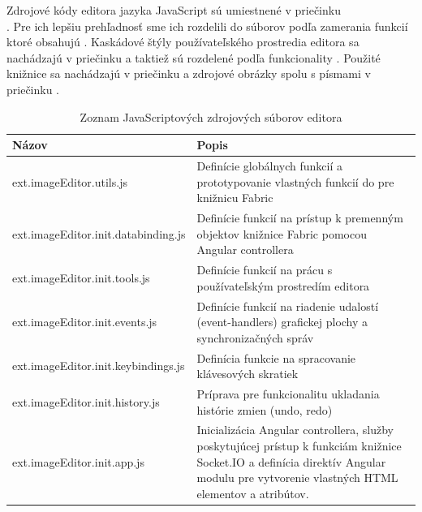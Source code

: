 Zdrojové kódy editora jazyka JavaScript sú umiestnené v priečinku \\
. Pre ich lepšiu prehľadnosť sme ich rozdelili do súborov podľa zamerania funkcií ktoré obsahujú . Kaskádové štýly používateľského prostredia editora sa nachádzajú v priečinku  a taktiež sú rozdelené podľa funkcionality . Použité knižnice sa nachádzajú v priečinku  a zdrojové obrázky spolu s písmami v priečinku .

\begin{table}
	\begin{tabular}{ | m{6cm} | m{6.5cm} | } \hline
		\textbf{Názov} & \textbf{Popis} \\ \hline \hline
		
		ext.imageEditor.utils.js & Definície globálnych funkcií a prototypovanie vlastných funkcií do pre knižnicu Fabric \\\hline
		ext.imageEditor.init.databinding.js & Definície funkcií na prístup k premenným objektov knižnice Fabric pomocou Angular controllera \\\hline
		ext.imageEditor.init.tools.js & Definície funkcií na prácu s používateľským prostredím editora \\\hline
		ext.imageEditor.init.events.js & Definície funkcií na riadenie udalostí (event-handlers) grafickej plochy a synchronizačných správ \\\hline
		ext.imageEditor.init.keybindings.js & Definícia funkcie na spracovanie klávesových skratiek \\\hline
		ext.imageEditor.init.history.js & Príprava pre funkcionalitu ukladania histórie zmien (undo, redo) \\\hline
		ext.imageEditor.init.app.js & Inicializácia Angular controllera, služby poskytujúcej prístup k funkciám knižnice Socket.IO a definícia direktív Angular modulu pre vytvorenie vlastných HTML elementov a atribútov. \\\hline
		
		\hline
	\end{tabular}
	\caption{Zoznam JavaScriptových zdrojových súborov editora}
	\label{tab:editor-scripts-files}
\end{table}

